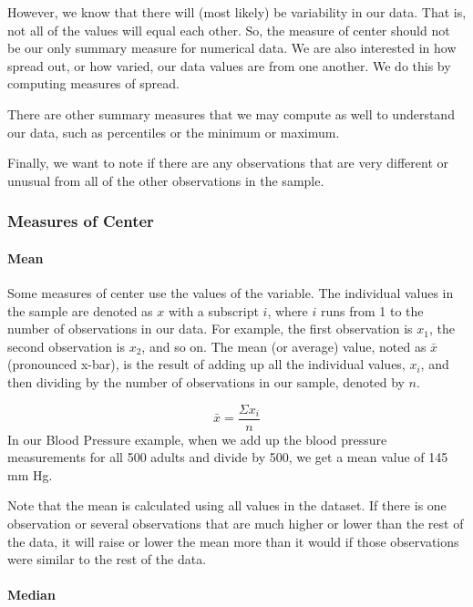 \documentclass[
]{book}
\begin{document}
However, we know that there will (most likely) be variability in our data. That is, not all of the values will equal each other. So, the measure of center should not be our only summary measure for numerical data. We are also interested in how spread out, or how varied, our data values are from one another. We do this by computing measures of spread.

There are other summary measures that we may compute as well to understand our data, such as percentiles or the minimum or maximum.

Finally, we want to note if there are any observations that are very different or unusual from all of the other observations in the sample.

\hypertarget{measures-of-center}{%
\subsubsection{Measures of Center}\label{measures-of-center}}

\hypertarget{mean}{%
\paragraph{Mean}\label{mean}}

Some measures of center use the values of the variable. The individual values in the sample are denoted as \(x\) with a subscript \(i\), where \(i\) runs from 1 to the number of observations in our data. For example, the first observation is \(x_1\), the second observation is \(x_2\), and so on. The mean (or average) value, noted as \(\bar{x}\) (pronounced x-bar), is the result of adding up all the individual values, \(x_i\), and then dividing by the number of observations in our sample, denoted by \(n\).

\[
\bar{x} = \frac{\Sigma x_i}{n}
\]
In our Blood Pressure example, when we add up the blood pressure measurements for all 500 adults and divide by 500, we get a mean value of 145 mm Hg.

Note that the mean is calculated using all values in the dataset. If there is one observation or several observations that are much higher or lower than the rest of the data, it will raise or lower the mean more than it would if those observations were similar to the rest of the data.

\hypertarget{median}{%
\paragraph{Median}\label{median}}
\end{document}
